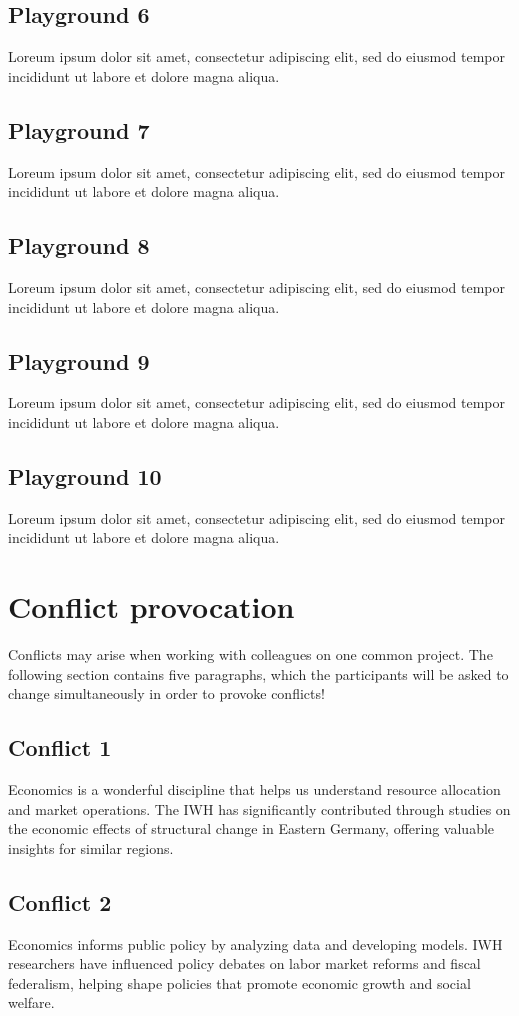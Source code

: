 \documentclass{article}
\begin{document}
\subsection{Playground 6}
Loreum ipsum dolor sit amet, consectetur adipiscing elit, sed do eiusmod tempor incididunt ut labore et dolore magna aliqua.
\subsection{Playground 7}
Loreum ipsum dolor sit amet, consectetur adipiscing elit, sed do eiusmod tempor incididunt ut labore et dolore magna aliqua.
\subsection{Playground 8}
Loreum ipsum dolor sit amet, consectetur adipiscing elit, sed do eiusmod tempor incididunt ut labore et dolore magna aliqua.
\subsection{Playground 9}
Loreum ipsum dolor sit amet, consectetur adipiscing elit, sed do eiusmod tempor incididunt ut labore et dolore magna aliqua.
\subsection{Playground 10}
Loreum ipsum dolor sit amet, consectetur adipiscing elit, sed do eiusmod tempor incididunt ut labore et dolore magna aliqua.




\section{Conflict provocation}
Conflicts may arise when working with colleagues on one common project. The following section contains five paragraphs, which the participants will be asked to change simultaneously in order to provoke conflicts!

\subsection{Conflict 1}
Economics is a wonderful discipline that helps us understand resource allocation and market operations. The IWH has significantly contributed through studies on the economic effects of structural change in Eastern Germany, offering valuable insights for similar regions.

\subsection{Conflict 2}
Economics informs public policy by analyzing data and developing models. IWH researchers have influenced policy debates on labor market reforms and fiscal federalism, helping shape policies that promote economic growth and social welfare.
\end{document}
